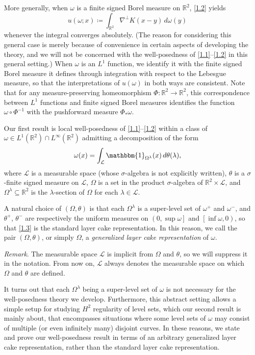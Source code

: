 \documentclass[reqno,centertags,12pt]{amsart}
\theoremstyle{definition}
\numberwithin{equation}{section}
\newcommand{\bbR}{{\mathbb{R}}}
\begin{document}
More generally, when $\omega$ is a finite signed Borel measure on $\bbR^{2}$,
\eqref{1.2} yields
\[
    u(\omega;x) \coloneqq \int_{\bbR^{2}}
    \nabla^{\perp}K(x - y)\,d\omega(y)
\]
whenever the integral converges absolutely. (The reason for considering this general case
is merely because of convenience in certain aspects of developing the theory, and we will
not be concerned with the well-posedness of \eqref{1.1}--\eqref{1.2} in this general setting.)
When $\omega$ is an $L^{1}$ function, we identify it with the finite signed Borel measure
it defines through integration with respect to the Lebesgue measure, so that
the interpretations of $u(\omega)$ in both ways are consistent.
Note that for any measure-preserving homeomorphism $\Phi\colon\bbR^{2}\to\bbR^{2}$,
this correspondence between $L^{1}$ functions and finite signed Borel measures
identifies the function $\omega\circ\Phi^{-1}$ with the pushforward measure $\Phi_{*}\omega$.

Our first result is local well-posedness of \eqref{1.1}--\eqref{1.2}
within a class of $\omega\in L^{1}(\bbR^{2})\cap L^{\infty}(\bbR^{2})$
admitting a decomposition of the form
\begin{equation}\label{1.3}
    \omega(x) = \int_{\mathcal{L}}\mathbbm{1}_{\Omega^{\lambda}}(x)\,d\theta(\lambda),
\end{equation}
where $\mathcal{L}$ is a measurable space (whose $\sigma$-algebra is not explicitly written),
$\theta$ is a $\sigma$-finite signed measure on $\mathcal{L}$, $\Omega$ is a set in
the product $\sigma$-algebra of $\bbR^{2}\times\mathcal{L}$,
and $\Omega^{\lambda}\subseteq\bbR^{2}$ is the $\lambda$-section of $\Omega$
for each $\lambda\in\mathcal{L}$.

A natural choice of $(\Omega,\theta)$ is that each $\Omega^{\lambda}$
is a super-level set of $\omega^{+}$ and $\omega^{-}$, and
$\theta^{+}$, $\theta^{-}$ are respectively the uniform measures on
$\left(0,\sup\omega\right]$ and
$\left[\inf\omega,0\right)$, so that \eqref{1.3}
is the standard layer cake representation.
In this reason, we call the pair $(\Omega,\theta)$, or simply $\Omega$,
a \emph{generalized layer cake representation} of $\omega$.\smallskip

\textit{Remark}. The measurable space $\mathcal{L}$ is implicit from $\Omega$ and $\theta$,
so we will suppress it in the notation. From now on, $\mathcal{L}$ always
denotes the measurable space on which $\Omega$ and $\theta$ are defined.\smallskip

It turns out that each $\Omega^{\lambda}$ being a super-level set of $\omega$
is not necessary for the well-posedness theory we develop.
Furthermore, this abstract setting allows a simple setup for
studying $H^{2}$ regularity of level sets, which our second result is mainly about,
that encompasses situations where some level sets of $\omega$
may consist of multiple (or even infinitely many) disjoint curves.
In these reasons, we state and prove our well-posedness result in terms of
an arbitrary generalized layer cake representation, rather than
the standard layer cake representation.
\end{document}
